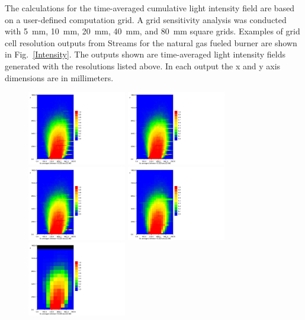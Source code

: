 \documentclass[twoside]{uocthesis}
\begin{document}
{The calculations for the time-averaged cumulative light intensity field are based on a user-defined computation grid.  A grid sensitivity analysis was conducted with 5~mm, 10~mm, 20~mm, 40~mm, and 80~mm square grids.  Examples of grid cell resolution outputs from Streams for the natural gas fueled burner are shown in Fig.~\ref{Intensity}.  The outputs shown are time-averaged light intensity fields generated with the resolutions listed above. In each output the x and y axis dimensions are in millimeters.

\begin{figure}[p]
	\centering
	\includegraphics[trim=0in 0in 3.5in 0in,clip=true,width=1.7in]{../Figures/FHNG80_1_GS_5mm_10s_color}
	\includegraphics[trim=0in 0in 3.5in 0in,clip=true,width=1.7in]{../Figures/FHNG80_1_GS_10mm_10s_color}\\
	\includegraphics[trim=0in 0in 3.5in 0in,clip=true,width=1.7in]{../Figures/FHNG80_1_GS_20mm_10s_color}
	\includegraphics[trim=0in 0in 3.5in 0in,clip=true,width=1.7in]{../Figures/FHNG80_1_GS_40mm_10s_color}
	\includegraphics[trim=0in 0in 3.5in 0in,clip=true,width=1.7in]{../Figures/FHNG80_1_GS_80mm_10s_color}\\

\end{figure}}
\end{document}
